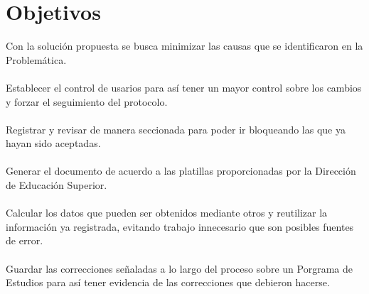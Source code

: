 \section{Objetivos}
Con la solución propuesta se busca minimizar las causas que se identificaron en la Problemática.\\
\\
Establecer el control de usarios para así tener un mayor control sobre los cambios y forzar el seguimiento del protocolo.\\
\\
Registrar y revisar de manera seccionada para poder ir bloqueando las que ya hayan sido aceptadas.\\
\\
Generar el documento de acuerdo a las platillas proporcionadas por la Dirección de Educación Superior.\\
\\
Calcular los datos que pueden ser obtenidos mediante otros y reutilizar la información ya registrada, evitando trabajo innecesario que son posibles fuentes de error.\\
\\
Guardar las correcciones señaladas a lo largo del proceso sobre un Porgrama de Estudios para así tener evidencia de las correcciones que debieron hacerse.